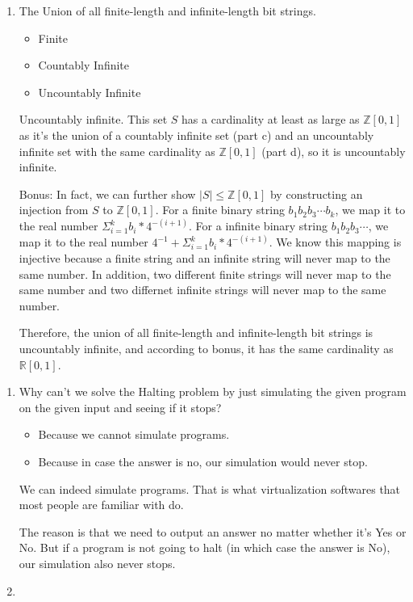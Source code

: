 \documentclass[11pt,preview]{standalone} %
\begin{document}
\begin{enumerate}
\begin{enumerate}
		\item The Union of all finite-length and infinite-length bit strings.
		\begin{Choices}
		\begin{itemize}
			\FalseChoice\item Finite
			\FalseChoice\item Countably Infinite
			\TrueChoice\item Uncountably Infinite
		\end{itemize}

		\Solution Uncountably infinite. This set $S$ has a cardinality at least as large as $\mathbb{Z}[0, 1]$ as it's the union of a countably infinite set 
		(part c) and an uncountably infinite set with the same cardinality as $\mathbb{Z}[0, 1]$ (part d), so it is uncountably infinite.

		Bonus: In fact, we can further show $|S| \leq \mathbb{Z}[0, 1]$ by constructing an injection from $S$ to $\mathbb{Z}[0, 1]$. For a finite binary string $b_1b_2b_3 \cdots b_k$, we map it to the real number $\Sigma_{i=1} ^ k b_i * 4 ^ {-(i+1)}$. For a infinite binary string $b_1b_2b_3 \cdots$, we map it to the real number $4^{-1} + \Sigma_{i=1} ^ k b_i * 4 ^ {-(i+1)}$. We know this mapping is injective because a finite string and an infinite string will never map to the same number. In addition, two different finite strings will never map to the same number and two differnet infinite strings will never map to the same number. 

		Therefore, the union of all finite-length and infinite-length bit strings is uncountably infinite, and according to bonus, it has the same cardinality as $\mathbb{R}[0, 1]$.
		\end{Choices}

	\end{enumerate}

\end{enumerate}


\begin{enumerate}
	\item Why can't we solve the Halting problem by just simulating the given program on the given input and seeing if it stops?
	\begin{Multi}
	\begin{itemize}
		\FalseChoice\item Because we cannot simulate programs.
		\TrueChoice\item Because in case the answer is no, our simulation would never stop.
	\end{itemize}
	\Solution We can indeed simulate programs. That is what virtualization softwares that most people are familiar with do.
	
	The reason is that we need to output an answer no matter whether it's Yes or No. But if a program is not going to halt (in which case the answer is No), our simulation also never stops.
	\end{Multi}
	
	\item 

\end{enumerate}
\end{document}
